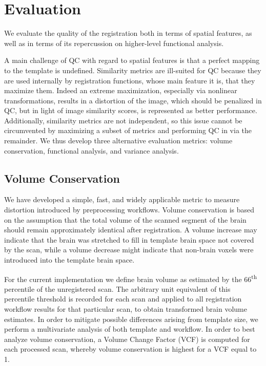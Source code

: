 \section{Evaluation}

We evaluate the quality of the registration both in terms of spatial features, as well as in terms of its repercussion on higher-level functional analysis.

A main challenge of QC with regard to spatial features is that a perfect mapping to the template is undefined.
Similarity metrics are ill-suited for QC because they are used internally by registration functions, whose main feature it is, that they maximize them.
Indeed an extreme maximization, especially via nonlinear transformations, results in a distortion of the image, which should be penalized in QC, but in light of image similarity scores, is represented as better performance.
Additionally, similarity metrics are not independent, so this issue cannot be circumvented by maximizing a subset of metrics and performing QC in via the remainder.
We thus develop three alternative evaluation metrics: volume conservation, functional analysis, and variance analysis.

\subsection{Volume Conservation}

We have developed a simple, fast, and widely applicable metric to measure distortion introduced by preprocessing workflows.
Volume conservation is based on the assumption that the total volume of the scanned segment of the brain should remain approximately identical after registration.
A volume increase may indicate that the brain was stretched to fill in template brain space not covered by the scan, while a volume decrease might indicate that non-brain voxels were introduced into the template brain space.

For the current implementation we define brain volume as estimated by the 66\textsuperscript{th} percentile of the unregistered scan.
The arbitrary unit equivalent of this percentile threshold is recorded for each scan and applied to all registration workflow results for that particular scan, to obtain transformed brain volume estimates.
In order to mitigate possible differences arising from template size, we perform a multivariate analysis of both template and workflow.
In order to best analyze volume conservation, a Volume Change Factor (VCF) is computed for each processed scan, whereby volume conservation is highest for a VCF equal to 1.

